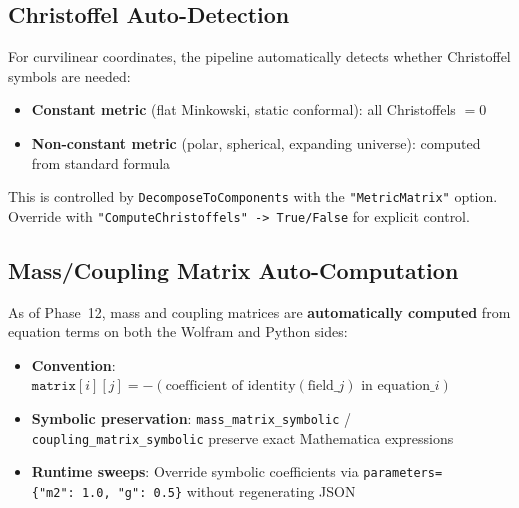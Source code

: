 \subsection{Christoffel Auto-Detection}

For curvilinear coordinates, the pipeline automatically detects whether Christoffel symbols are needed:

\begin{itemize}
  \item \textbf{Constant metric} (flat Minkowski, static conformal): all Christoffels $= 0$
  \item \textbf{Non-constant metric} (polar, spherical, expanding universe): computed from standard formula
\end{itemize}

This is controlled by \texttt{DecomposeToComponents} with the \texttt{"MetricMatrix"} option. Override with \texttt{"ComputeChristoffels"~->~True/False} for explicit control.

\subsection{Mass/Coupling Matrix Auto-Computation}

As of Phase~12, mass and coupling matrices are \textbf{automatically computed} from equation terms on both the Wolfram and Python sides:

\begin{itemize}
  \item \textbf{Convention}: $\texttt{matrix}[i][j] = -(\text{coefficient of identity}(\text{field}\_j) \text{ in equation}\_i)$
  \item \textbf{Symbolic preservation}: \texttt{mass\_matrix\_symbolic} / \texttt{coupling\_matrix\_symbolic} preserve exact Mathematica expressions
  \item \textbf{Runtime sweeps}: Override symbolic coefficients via \texttt{parameters=\{"m2":~1.0,~"g":~0.5\}} without regenerating JSON
\end{itemize}
